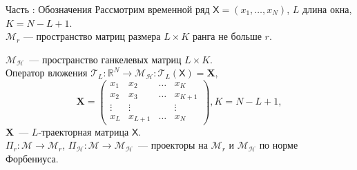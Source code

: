 \documentclass[10pt, ucs, notheorems, handout]{beamer}
\newcommand{\tX}[1]{\mathsf{#1}}
\newcommand{\RomanNumeralCaps}[1]
{\MakeUppercase{\romannumeral #1}}
\begin{document}


\begin{frame}{Часть \RomanNumeralCaps{1}: Обозначения}
	Рассмотрим временной ряд $\tX{X}=(x_1, \ldots, x_{N})$, $L$ длина окна, $K=N-L+1$.\\
	\vspace{1em}
	$\mathcal{M}_{r}$ --- пространство матриц размера $L \times K$ ранга не больше $r$.
	
	$\mathcal{M}_{\mathcal{H}}$~--- пространство ганкелевых матриц $L\times K$.\\
	\vspace{1em}
	Оператор вложения $\mathcal{T}_L:\mathbb{R}^N \rightarrow \mathcal{M}_{\mathcal{H}}: \mathcal{T}_L (\tX{X}) = \mathbf{X} $,\\
	$$\mathbf{X} = \begin{pmatrix}
		x_1 & x_2 & \ldots & x_{K}\\
		x_2 & x_3 & \ldots & x_{K+1}\\
		\vdots & \vdots & & \vdots\\
		x_{L} & x_{L+1} & \ldots & x_{N}
	\end{pmatrix}, K = N - L + 1,$$
	$\mathbf{X}$~--- $L$-траекторная матрица $\tX{X}$.\\
	\vspace{1em}
	$\Pi_{r}:\mathcal{M}\rightarrow \mathcal{M}_r$,
	$\Pi_{\mathcal{H}}:\mathcal{M} \rightarrow \mathcal{M}_{\mathcal{H}}$~--- проекторы на $\mathcal{M}_{r}$ и $\mathcal{M}_{\mathcal{H}}$ по норме Форбениуса.
	
	\note{}
	
\end{frame}
\end{document}
